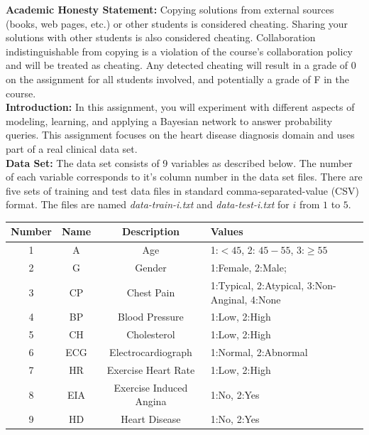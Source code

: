 \documentclass[11pt]{article}
\begin{document}
\textbf{Academic Honesty Statement:} Copying solutions from external
sources (books, web pages, etc.) or other students is considered
cheating. Sharing your solutions with other students is also
considered cheating. Collaboration indistinguishable from copying is a violation 
of the course's collaboration policy and will be treated as cheating.
Any detected cheating will result in a grade of 0
on the assignment for all students involved, and potentially a grade
of F in the course.\\

\textbf{Introduction:} In this assignment, you will experiment with different aspects of modeling, learning, and applying a Bayesian network to answer probability queries. This assignment focuses on the heart disease diagnosis domain and uses part of a real clinical data set. 
\\

\textbf{Data Set:} The data set consists of 9 variables as described below. The number of each variable corresponds to it's column number in the data set files. There are five sets of training and test data files in standard comma-separated-value (CSV) format. The files are named \textit{data-train-i.txt} and \textit{data-test-i.txt} for $i$ from $1$ to $5$.\\

\begin{center}
\begin{tabular}{|c|c|c|l|}\hline
Number & Name & Description & Values\\ \hline\hline
1 & A   &  Age          & 1:$<45$, 2: $45-55$, 3:$\geq 55$\\ \hline
2 & G   &  Gender                  & 1:Female, 2:Male;\\ \hline
3 & CP  &  Chest Pain & 1:Typical, 2:Atypical, 3:Non-Anginal, 4:None\\ \hline
4 & BP  &  Blood Pressure          & 1:Low, 2:High\\ \hline
5 & CH  &  Cholesterol             & 1:Low, 2:High\\ \hline
6 & ECG &  Electrocardiograph      & 1:Normal, 2:Abnormal\\ \hline
7 & HR  &  Exercise Heart Rate     & 1:Low, 2:High\\ \hline
8 & EIA &  Exercise Induced Angina & 1:No, 2:Yes\\ \hline
9 & HD  & Heart Disease            & 1:No, 2:Yes\\ \hline
\end{tabular}
\end{center}
\vspace{1em}
\end{document}
